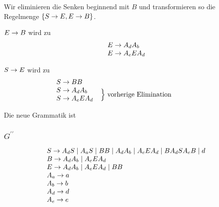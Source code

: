 \documentclass{article}
\begin{document}
\begin{center}
\end{center}
 
Wir eliminieren die Senken beginnend mit $B$ und transformieren so die
Regelmenge $\{S \rightarrow E, E \rightarrow B\}$.

\textcolor{teal}{$E \rightarrow B$} wird zu 
\begin{align*}
   \begin{array}{l}
      E \rightarrow A_dA_b \\
      E \rightarrow A_eEA_d
\end{array}
\end{align*}

\textcolor{teal}{$S \rightarrow E$} wird zu 
\begin{align*}
   \begin{array}{lr}
      S \r BB \\
   S \r A_dA_b &
   \multirow{2}{5cm}{$\left.\raisebox{0pt}[\baselineskip]{}\right\}$ vorherige
Elimination}\\
      S \r A_eEA_d
\end{array}
\end{align*}

Die neue Grammatik ist

\subsubsection{$G^{\prime\prime}$}

\begin{align*}
\begin{array}{l}
   S \rightarrow A_dS \mid A_aS \mid BB \mid A_dA_b \mid A_eEA_d \mid BA_dSA_eB \mid d \\
   B \rightarrow A_dA_b \mid A_eEA_d \\
   E \rightarrow A_dA_b \mid A_eEA_d \mid BB \\
   A_a \rightarrow a  \\
   A_b \rightarrow b \\
   A_d \rightarrow d \\
   A_e \rightarrow e
\end{array}
\end{align*}
\end{document}
